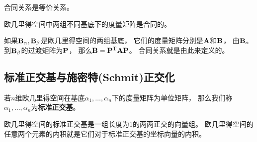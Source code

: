 \begin{remark}
  合同关系是等价关系。
\end{remark}

\begin{theorem}[不同基底下的度量矩阵的关系] \label{thrm:metric-mat-rel}
  欧几里得空间中两组不同基底下的度量矩阵是合同的。
\end{theorem}

\begin{remark}
  如果$\mathbf{B}_{\alpha},\mathbf{B}_{\beta}$是欧几里得空间的两组基底，
  它们的度量矩阵分别是$\mathbf{A}$和$\mathbf{B}$，
  由$\mathbf{B}_{\alpha}$到$\mathbf{B}_{\beta}$的过渡矩阵为$\mathbf{P}$，
  那么$\mathbf{B}=\mathbf{P}^{\textrm{T}}\mathbf{A}\mathbf{P}$。
  合同关系就是由此来定义的。
\end{remark}

\subsection{标准正交基与施密特(Schmit)正交化}
\begin{definition}[标准正交基]
  若$n$维欧几里得空间在基底$\alpha_1,\dots,\alpha_n$下的度量矩阵为单位矩阵，
  那么我们称$\alpha_1,\dots,\alpha_n$为\textbf{标准正交基}。
\end{definition}

\begin{remark}
  欧几里得空间的标准正交基是一组长度为1的两两正交的向量组。
  欧几里得空间的任意两个元素的内积就是它们对于标准正交基的坐标向量的内积。
\end{remark}

